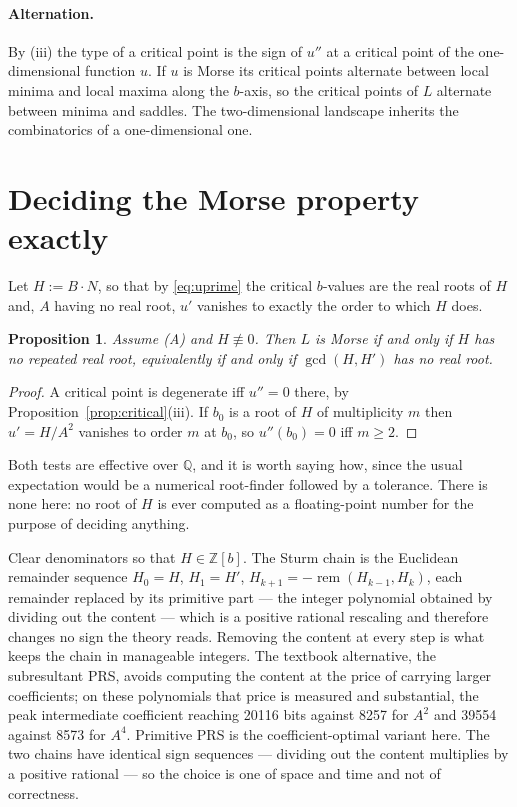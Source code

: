 \documentclass[11pt]{article}
\theoremstyle{plain}
\newtheorem{proposition}[theorem]{Proposition}
\theoremstyle{definition}
\theoremstyle{remark}
\newcommand{\Q}{\mathbb{Q}}
\begin{document}
\paragraph{Alternation.} By (iii) the type of a critical point is the sign of
$u''$ at a critical point of the one-dimensional function $u$. If $u$ is Morse
its critical points alternate between local minima and local maxima along the
$b$-axis, so the critical points of $L$ alternate between minima and saddles.
The two-dimensional landscape inherits the combinatorics of a
one-dimensional one.

\section{Deciding the Morse property exactly}

Let $H := B \cdot N$, so that by \eqref{eq:uprime} the critical $b$-values are
the real roots of $H$ and, $A$ having no real root, $u'$ vanishes to exactly
the order to which $H$ does.

\begin{proposition}\label{prop:morse}
Assume \textup{(A)} and $H \not\equiv 0$. Then $L$ is Morse if and only if $H$
has no repeated real root, equivalently if and only if $\gcd(H, H')$ has no
real root.
\end{proposition}

\begin{proof}
A critical point is degenerate iff $u'' = 0$ there, by
Proposition~\ref{prop:critical}(iii). If $b_0$ is a root of $H$ of multiplicity
$m$ then $u' = H/A^2$ vanishes to order $m$ at $b_0$, so $u''(b_0) = 0$ iff
$m \geq 2$.
\end{proof}

Both tests are effective over $\Q$, and it is worth saying how, since the
usual expectation would be a numerical root-finder followed by a tolerance.
There is none here: no root of $H$ is ever computed as a floating-point
number for the purpose of deciding anything.

Clear denominators so that $H \in \mathbb{Z}[b]$. The Sturm chain is the
Euclidean remainder sequence $H_0 = H$, $H_1 = H'$,
$H_{k+1} = -\operatorname{rem}(H_{k-1}, H_k)$, each remainder replaced by its
primitive part --- the integer polynomial obtained by dividing out the content
--- which is a positive rational rescaling and therefore changes no sign the
theory reads. Removing the content at every step is what keeps the chain in
manageable integers. The textbook alternative, the subresultant PRS, avoids
computing the content at the price of carrying larger coefficients; on these
polynomials that price is measured and substantial, the peak intermediate
coefficient reaching 20116 bits against 8257 for $A^2$ and 39554 against 8573
for $A^4$. Primitive PRS is the coefficient-optimal variant here. The two
chains have identical sign sequences --- dividing out the content multiplies
by a positive rational --- so the choice is one of space and time and not of
correctness.
\end{document}
